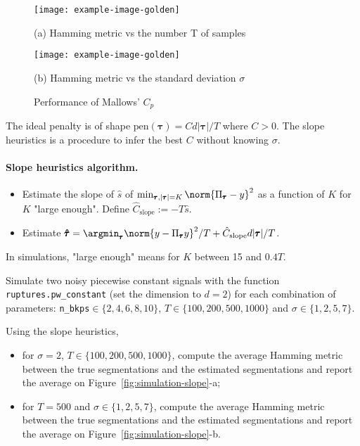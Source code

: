 \documentclass[11pt]{article}
\begin{document}
\begin{solution}
\begin{figure}
    \centering
    \begin{minipage}[t]{0.45\textwidth}
    \centerline{\texttt{[image: example-image-golden]}}
    \centerline{(a) Hamming metric vs the number T of samples}
    \end{minipage}
    \hfill
    \begin{minipage}[t]{0.45\textwidth}    \centerline{\texttt{[image: example-image-golden]}}
    \centerline{(b) Hamming metric vs the standard deviation $\sigma$}
    \end{minipage}
    \caption{Performance of Mallows' $C_p$}\label{fig:simulation-mallows}
\end{figure}
\end{solution}

\newpage
\begin{exercise}[subtitle=Slope heuristics]
The ideal penalty is of shape $\text{pen} (\pmb{\tau}) = Cd|\pmb{\tau}|/T$ where $C>0$. The slope heuristics is a procedure to infer the best $C$ without knowing $\sigma$.

\paragraph{Slope heuristics algorithm.}
\begin{itemize}
    \item Estimate the slope of $\hat{s}$ of $\min_{\pmb{\tau}, |\pmb{\tau}|=K}\norm{\Pi_{\pmb{\tau}}-y}^2$ as a function of $K$ for $K$ "large enough". Define $\hat{C}_{\text{slope}} := -T\hat{s}$.
    \item Estimate $\pmb{\hat{\tau}} = \argmin_{\pmb{\tau}} \norm{y - \Pi_{\pmb{\tau}}y}^2/T + \hat{C}_{\text{slope}} d|\pmb{\tau}|/T$.
\end{itemize}
In simulations, "large enough" means for $K$ between 15 and $0.4T$.

Simulate two noisy piecewise constant signals with the function \texttt{ruptures.pw\_constant} (set the dimension to $d=2$) for each combination of parameters: \texttt{n\_bkps}$\in\{2, 4, 6, 8, 10\}$, $T\in \{100, 200, 500, 1000\}$ and $\sigma\in \{1, 2, 5, 7\}$.

Using the slope heuristics,
\begin{itemize}
    \item for $\sigma = 2$, $T\in \{100, 200, 500, 1000\}$, compute the average Hamming metric between the true segmentations and the estimated segmentations and report the average on Figure~\ref{fig:simulation-slope}-a;
    \item for $T = 500$ and $\sigma\in \{1, 2, 5, 7\}$, compute the average Hamming metric between the true segmentations and the estimated segmentations and report the average on Figure~\ref{fig:simulation-slope}-b.
\end{itemize}

\end{exercise}
\end{document}
